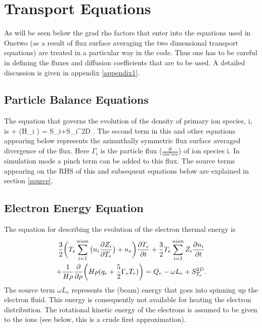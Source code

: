 \section{Transport Equations}\label{sec:transport}

As will be seen below the grad rho factors that enter into the equations used in
Onetwo (as a result of flux surface averaging the two dimensional transport
equations) are treated in a  particular way in the code. Thus one has to be
careful in defining the fluxes and  diffusion coefficients that are to be used.
A detailed discussion is given in appendix \ref{appendix1}.

\subsection{Particle Balance Equations}

The equation that governs the evolution of  the density of primary ion species,
i, is
\beq
 +\ddiff{\rho} \big(H\rho\Gamma_i
 \big) =
 S_i+S_i^{2D} \label{eq:ni}.
\eeq
The second term in this and other equations appearing below represents the
azimuthally symmetric flux surface averaged divergence of the flux. Here
$\Gamma_i $ is the particle flux ($\frac{\#}{cm^2sec} $) of ion species i. In
simulation mode a pinch term can be added to  this flux. The source terms
appearing on the RHS of this and  subsequent equations below are explained in
section \ref{source}. 

\subsection{Electron Energy Equation}

The equation for describing the evolution of the electron thermal energy is 
\begin{multline} 
 \frac{3}{2}\bigg (T_e\sum_{i=1}^{nion}\big(n_i\frac{\partial{ Z_i}}{\partial{ T_e}}\big) + n_e
  \bigg)\frac{\partial{ T_e}}{\partial{ t}} 
 +\frac{3}{2}T_e \sum_{i=1}^{nion}Z_i\frac{\partial{ n_i}}{\partial{ t}} \\
 +\frac{1}{H\rho}\frac{\partial}{\partial \rho}\bigg(H\rho (
  q_e+\frac{5}{2}\Gamma_e T_e) \bigg)
 =Q_e  -\omega L_e + S^{2D}_{T_e} \label{eq:eenergy}.
\end{multline}
The source term $\omega L_e $ represents the (beam) energy that goes into
spinning up the electron fluid. This energy is consequently not available for
heating the electron distribution. The rotational kinetic energy of the
electrons is  assumed to be given to the ions (see below, this is a crude first
approximation).  


